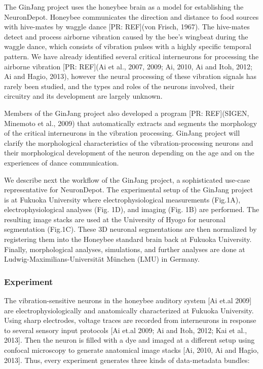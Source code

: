 \documentclass{frontiersSCNS} %
\newcommand{\pr}[1]{[\textcolor{YellowOrange}{PR: #1}]}
\begin{document}
The GinJang project uses the honeybee brain as a model for establishing the
NeuronDepot. Honeybee communicates the direction and distance to food sources
with hive-mates by waggle dance \pr{REF}(von Frisch, 1967). The hive-mates detect and
process airborne vibration caused by the bee's wingbeat during the waggle
dance, which consists of vibration pulses with a highly specific temporal
pattern. We have already identified several critical interneurons for
processing the airborne vibration \pr{REF}(Ai et al., 2007, 2009; Ai, 2010, Ai and
Itoh, 2012; Ai and Hagio, 2013), however the neural processing of these
vibration signals has rarely been studied, and the types and roles of the
neurons involved, their circuitry and its development are largely unknown. 

Members of the GinJang project also developed a program \pr{REF}(SIGEN, Minemoto et
al., 2009)  that automatically extracts and segments the morphology of the
critical interneurons in the vibration processing. GinJang project will clarify
the morphological characteristics of the vibration-processing neurons and their
morphological development of the neuron depending on the age and on the
experiences of dance communication.  

We describe next the workflow of the GinJang project, a sophisticated use-case
representative for NeuronDepot. The experimental setup of the GinJang project
is at Fukuoka University where electrophysiological measurements (Fig.1A),
electrophysiological analyses (Fig. 1D), and imaging (Fig. 1B) are performed.
The resulting image stacks are used at the University of Hyogo for neuronal
segmentation (Fig.1C). These 3D neuronal segmentations are then normalized by
registering them into the Honeybee standard brain back at Fukuoka University.
Finally, morphological analyses, simulations, and further analyses  are done at
Ludwig-Maximilians-Universität München (LMU) in Germany.


\subsubsection{Experiment}

The vibration-sensitive neurons in the honeybee auditory system  [Ai et.al 2009]  are electrophysiologically and anatomically characterized at Fukuoka University. Using sharp electrodes, voltage traces are recorded from interneurons in response to several sensory input protocols [Ai et.al 2009; Ai and Itoh, 2012; Kai et al., 2013]. Then the neuron is filled with a dye and imaged at a different setup using confocal microscopy to generate anatomical image stacks [Ai, 2010, Ai and Hagio, 2013]. Thus, every experiment generates three kinds of data-metadata bundles:
\end{document}
